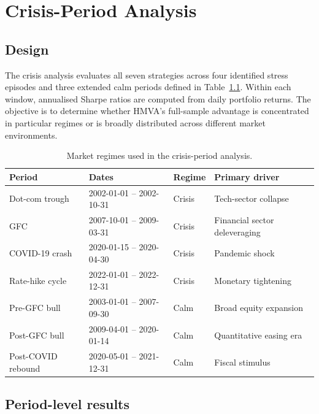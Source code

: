 \documentclass[a4paper,12pt]{report}
\begin{document}
\chapter{Crisis-Period Analysis}
\label{ch:crisis}

\section{Design}
\label{sec:crisis-design}

The crisis analysis evaluates all seven strategies across four identified
stress episodes and three extended calm periods defined in
Table~\ref{tab:crisis-periods}. Within each window, annualised Sharpe ratios
are computed from daily portfolio returns. The objective is to determine
whether HMVA's full-sample advantage is concentrated in particular regimes
or is broadly distributed across different market environments.

\begin{table}[H]
  \centering
  \caption{Market regimes used in the crisis-period analysis.}
  \label{tab:crisis-periods}
  \begin{tabular}{@{}llll@{}}
    \toprule
    Period & Dates & Regime & Primary driver \\
    \midrule
    Dot-com trough & 2002-01-01 -- 2002-10-31 & Crisis & Tech-sector collapse \\
    GFC & 2007-10-01 -- 2009-03-31 & Crisis & Financial sector deleveraging \\
    COVID-19 crash & 2020-01-15 -- 2020-04-30 & Crisis & Pandemic shock \\
    Rate-hike cycle & 2022-01-01 -- 2022-12-31 & Crisis & Monetary tightening \\
    Pre-GFC bull & 2003-01-01 -- 2007-09-30 & Calm & Broad equity expansion \\
    Post-GFC bull & 2009-04-01 -- 2020-01-14 & Calm & Quantitative easing era \\
    Post-COVID rebound & 2020-05-01 -- 2021-12-31 & Calm & Fiscal stimulus \\
    \bottomrule
  \end{tabular}
\end{table}

\section{Period-level results}
\label{sec:crisis-results}
\end{document}
